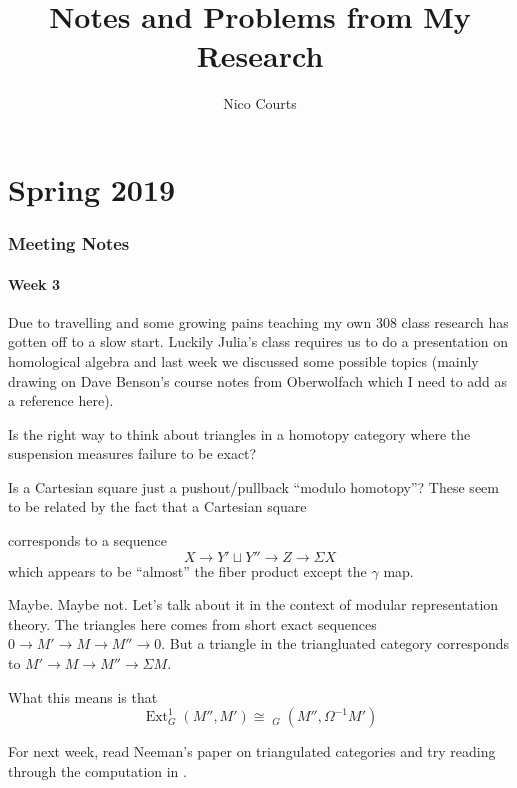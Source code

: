 \documentclass[12pt]{article}
\theoremstyle{nonumberbreak}
\theoremstyle{changebreak}
\theoremstyle{nonumberplain}
\theoremstyle{change}
\DeclareMathOperator{\Hom}{Hom}
\DeclareMathOperator{\Ext}{Ext}
\DeclareMathOperator{\stHom}{\underline{\Hom}}
\let\oldpart\part%
\renewcommand{\part}{\clearpage\oldpart}%
\begin{document}
\title{Notes and Problems from My Research\vspace{-1ex}}
\author{Nico Courts}
\date{}
\maketitle

\part{Spring 2019}
\section{Meeting Notes}

\subsection{Week 3}
Due to travelling and some growing pains teaching my own 308 class research has gotten off to a slow
start. Luckily Julia's class requires us to do a presentation on homological algebra and last week 
we discussed some possible topics (mainly drawing on Dave Benson's course notes from Oberwolfach which I need 
to add as a reference here).

\begin{qst} Is the right way to think about triangles in a homotopy category where the suspension
measures failure to be exact? 

Is a Cartesian square just a pushout/pullback ``modulo homotopy''? These seem to be related by 
the fact that a Cartesian square
\begin{center}
\end{center}
corresponds to a sequence
\[X\to Y'\sqcup Y''\to Z\to \Sigma X\]
which appears to be ``almost'' the fiber product except the $\gamma$ map.
\end{qst}

Maybe. Maybe not. Let's talk about it in the context of modular representation theory. The triangles 
here comes from short exact sequences $0\to M'\to M\to M''\to 0$. But a triangle in the 
triangluated category corresponds to $M'\to M\to M''\to \Sigma M$. 

What this means is that 
\[\Ext_G^1(M'',M')\cong \stHom_G(M'',\Omega^{-1}M')\]


For next week, read Neeman's paper on triangulated categories and try reading through the computation
in \cite{julia-dave}.
\end{document}
